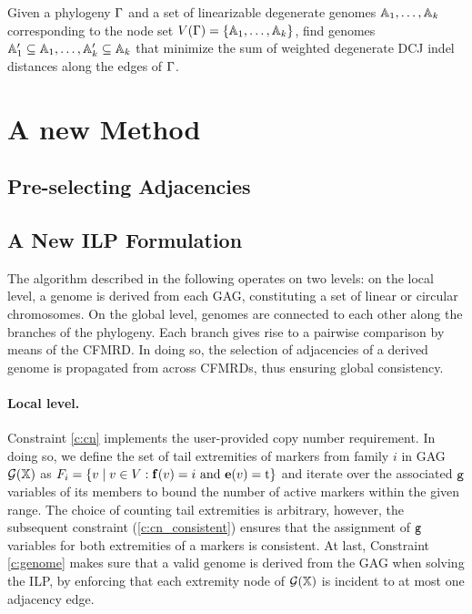 \documentclass[runningheads]{llncs}
\begin{document}
\begin{problem}\label{prb:spp_dcj}
    Given a phylogeny $\Gamma$ and a set of linearizable degenerate genomes $\mathbb{A}_1, \ldots, \mathbb{A}_k$ corresponding to the node set $V(\Gamma) = \{\mathbb{A}_1, \ldots, \mathbb{A}_k\}$, find genomes $\mathbb{A}'_1 \subseteq \mathbb{A}_1, \ldots, \mathbb{A}'_k \allowbreak \subseteq \mathbb{A}_k$ that minimize the sum of weighted degenerate DCJ indel distances along the edges of $\Gamma$. 
\end{problem}

\section{A new Method}
\subsection{Pre-selecting Adjacencies}
\subsection{A New ILP Formulation}



The algorithm described in the following operates on two levels: 
on the local level, a genome is derived from each GAG, constituting a set of linear or circular chromosomes. 
On the global level, genomes are connected to each other along the branches of the phylogeny. Each branch gives rise to a pairwise comparison by means of the CFMRD. 
In doing so, the selection of adjacencies of a derived genome is propagated from across CFMRDs, thus ensuring global consistency. 

\paragraph{Local level.} 
Constraint \ref{c:cn} implements the user-provided copy number requirement. 
In doing so, we define the set of tail extremities of markers from family $i$ in GAG $\mathcal{G}(\mathbb{X})$ as $F_i = \{ v \mid v \in V: \mathbf{f}(v) = i \text{ and } \mathbf{e}(v) = \textnormal{t}\}$ and iterate over the associated ${\texttt{g}}$ variables of its members to bound the number of active markers within the given range. 
The choice of counting tail extremities is arbitrary, however, the subsequent constraint (\ref{c:cn_consistent}) ensures that the assignment of ${\texttt{g}}$ variables for both extremities of a markers is consistent. 
At last, Constraint \ref{c:genome} makes sure that a valid genome is derived from the GAG when solving the ILP, by enforcing that each extremity node of $\mathcal{G}(\mathbb{X})$ is incident to at most one adjacency edge. 
\end{document}
